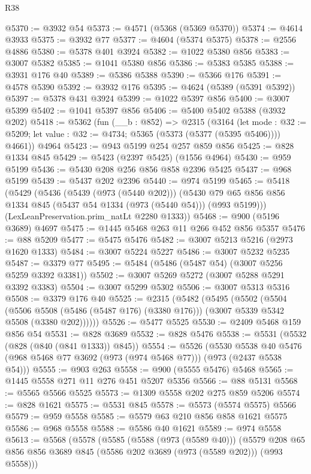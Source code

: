 \begin{lexlean}{R38}
\begin{coremodule}
@5370 := @3932 @54
@5373 := @4571 (@5368 (@5369 @5370))
@5374 := @4614 @3933
@5375 := @3932 @77
@5377 := @4604 (@5374 @5375)
@5378 := @2556 @4886
@5380 := @5378 @401 @3924
@5382 := @1022 @5380 @856
@5383 := @3007 @5382
@5385 := @1041 @5380 @856
@5386 := @5383 @5385
@5388 := @3931 @176 @40
@5389 := @5386 @5388
@5390 := @5366 @176
@5391 := @4578 @5390
@5392 := @3932 @176
@5395 := @4624 (@5389 (@5391 @5392))
@5397 := @5378 @431 @3924
@5399 := @1022 @5397 @856
@5400 := @3007 @5399
@5402 := @1041 @5397 @856
@5406 := @5400 @5402 @5388 (@3932 @202)
@5418 := @5362
    (fun (__b : @852) =>
    @2315
      (@3164
        (let mode : @32 := @5209; let value : @32 := @4734; @5365 (@5373 (@5377 (@5395 @5406))))
        @4661))
    @4964
@5423 := @943 @5199 @254 @257 @859 @856
@5425 := @828 @1334 @845
@5429 := @5423 (@2397 @5425) (@1556 @4964)
@5430 := @959 @5199
@5436 := @5430 @208 @256 @856 @858 @2396 @5425
@5437 := @968 @5199
@5439 := @5437 @202 @2396
@5440 := @974 @5199
@5465 := @5418
    (@5429
      (@5436
        (@5439 (@973 (@5440 @202)))
        (@5430 @79 @65 @856 @856 @1334 @845 (@5437 @54 @1334 (@973 (@5440 @54))) (@993 @5199)))
      (LexLeanPreservation.prim_natLt @2280 @1333))
@5468 := @900 (@5196 @3689) @4697
@5475 := @1445 @5468 @263 @11 @266 @452 @856 @5357
@5476 := @88 @5209
@5477 := @5475 @5476
@5482 := @3007 @5213 @5216 (@2973 @1620 @1333)
@5484 := @3007 @5224 @5227
@5486 := @3007 @5232 @5235
@5487 := @3379 @77
@5495 := @5484 (@5486 (@5487 @54) (@3007 @5256 @5259 @3392 @3381))
@5502 := @3007 @5269 @5272 (@3007 @5288 @5291 @3392 @3383)
@5504 := @3007 @5299 @5302
@5506 := @3007 @5313 @5316
@5508 := @3379 @176 @40
@5525 := @2315
    (@5482
      (@5495
        (@5502
          (@5504
            (@5506 @5508 (@5486 (@5487 @176) (@3380 @176)))
            (@3007 @5339 @5342 @5508 (@3380 @202))))))
@5526 := @5477 @5525
@5530 := @2409 @5468 @159 @856 @54
@5531 := @828 @3689
@5532 := @828 @5476
@5538 := @5531 (@5532 (@828 (@840 (@841 @1333)) @845))
@5554 := @5526
    (@5530 @5538 @40 @5476 (@968 @5468 @77 @3692 (@973 (@974 @5468 @77))) (@973 (@2437 @5538 @54)))
@5555 := @903 @263
@5558 := @900 (@5555 @5476) @5468
@5565 := @1445 @5558 @271 @11 @276 @451 @5207 @5356
@5566 := @88 @5131
@5568 := @5565 @5566 @5525
@5573 := @1309 @5558 @202 @275 @859 @5206
@5574 := @828 @1621
@5575 := @5531 @845
@5578 := @5573 (@5574 @5575) @5566
@5579 := @959 @5558
@5585 := @5579 @63 @210 @856 @858 @1621 @5575
@5586 := @968 @5558
@5588 := @5586 @40 @1621
@5589 := @974 @5558
@5613 := @5568
    (@5578
      (@5585
        (@5588 (@973 (@5589 @40)))
        (@5579 @208 @65 @856 @856 @3689 @845 (@5586 @202 @3689 (@973 (@5589 @202))) (@993 @5558)))

\end{coremodule}
\end{lexlean}
